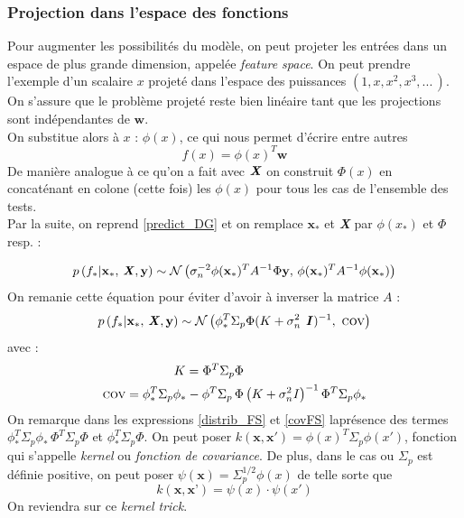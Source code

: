 \documentclass[a4paper,12pt]{report}
\newcommand{\bepar}[1]{
	\left( #1 \right)  
}
\numberwithin{equation}{section} %
\begin{document}
\subsubsection*{Projection dans l'espace des fonctions}
Pour augmenter les possibilités du modèle, on peut projeter les entrées dans un espace de plus grande dimension, appelée \textit{feature space}. On peut prendre l'exemple d'un scalaire $x$ projeté dans l'espace des puissances $\left( 1, x, x^2, x^3,...\,  \right )$.\\
On s'assure que le problème projeté reste bien linéaire tant que les projections sont indépendantes de $\textbf{w}$.\\ 
On substitue alors à $x$ : $\phi(x)$, ce qui nous permet d'écrire entre autres 
\begin{equation}
f(x) = \phi(x)^T\textbf{w}
\end{equation}
De manière analogue à ce qu'on a fait avec $\textbf{\textit{X}}$ on construit $\Phi(x)$ en concaténant en colone (cette fois) les $\phi(x)$ pour tous les cas de l'ensemble des tests.\\
Par la suite, on reprend \eqref{predict_DG} et on remplace $\textbf{x}_*$ et \textbf{\textit{X}} par $\phi(x_*)$ et $\Phi$ resp. :

\begin{equation}
p\bepar{f_*|\textbf{x}_*,\, \textbf{\textit{X}},\textbf{y}} \sim \mathcal{N}\bepar{\sigma_n^{-2}\phi(\textbf{x}_*)^TA^{-1}\Phi\textbf{y}, \, \phi(\textbf{x}_*)^T A^{-1} \phi(\textbf{x}_*)}
\end{equation}
On remanie cette équation pour éviter d'avoir à inverser la matrice  $A$ :
\begin{equation}
p\bepar{f_*|\textbf{x}_*,\, \textbf{\textit{X}},\textbf{y}} \sim \mathcal{N}\bepar{\phi_*^T \Sigma_p \Phi(K + \sigma_n^2 \textbf{ \textit{I}})^{-1}, \, \, \textsc{cov}} \label{distrib_FS}
\end{equation}
avec :
\begin{align}
K = \Phi^T \Sigma_p\Phi& \\
\textsc{cov} = \phi_*^T\Sigma_p\phi_* - \phi^T\Sigma_p\,\Phi&\left(K  + \sigma_n^2\mathbf{\mathit{I}}\right)^{-1}\Phi^T \Sigma_p\phi_* \label{covFS}
\end{align}
On remarque dans les expressions \eqref{distrib_FS} et \eqref{covFS} laprésence des termes $\displaystyle \phi_*^T\Sigma_p\phi_*\, \Phi^T\Sigma_p\Phi$ et $\phi_*^T\Sigma_p\Phi$. On peut poser $\displaystyle k(\textbf{x}, \textbf{x}') = \phi(x)^T\Sigma_p\phi(x')$, fonction qui s'appelle \textit{kernel} ou \textit{fonction de covariance}. De plus, dans le cas ou $\Sigma_p$ est définie positive, on peut poser $\displaystyle \psi(\textbf{x}) = \Sigma_p^{1/2} \phi(x)$ de telle sorte que
\begin{equation}
k(\textbf{x}, \textbf{x'}) = \psi(x)\cdot \psi(x')
\end{equation}
On reviendra sur ce \textit{kernel trick}.\\
\end{document}
